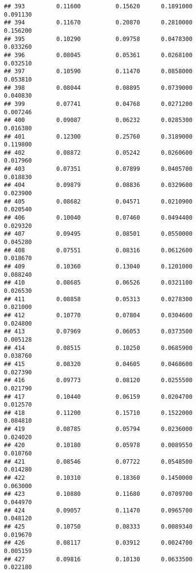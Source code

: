 \documentclass[
]{article}
\begin{document}
\begin{verbatim}
## 393         0.11600          0.15620      0.1891000            0.091130
## 394         0.11670          0.20870      0.2810000            0.156200
## 395         0.10290          0.09758      0.0478300            0.033260
## 396         0.08045          0.05361      0.0268100            0.032510
## 397         0.10590          0.11470      0.0858000            0.053810
## 398         0.08044          0.08895      0.0739000            0.040830
## 399         0.07741          0.04768      0.0271200            0.007246
## 400         0.09087          0.06232      0.0285300            0.016380
## 401         0.12300          0.25760      0.3189000            0.119800
## 402         0.08872          0.05242      0.0260600            0.017960
## 403         0.07351          0.07899      0.0405700            0.018830
## 404         0.09879          0.08836      0.0329600            0.023900
## 405         0.08682          0.04571      0.0210900            0.020540
## 406         0.10040          0.07460      0.0494400            0.029320
## 407         0.09495          0.08501      0.0550000            0.045280
## 408         0.07551          0.08316      0.0612600            0.018670
## 409         0.10360          0.13040      0.1201000            0.088240
## 410         0.08685          0.06526      0.0321100            0.026530
## 411         0.08858          0.05313      0.0278300            0.021000
## 412         0.10770          0.07804      0.0304600            0.024800
## 413         0.07969          0.06053      0.0373500            0.005128
## 414         0.08515          0.10250      0.0685900            0.038760
## 415         0.08320          0.04605      0.0468600            0.027390
## 416         0.09773          0.08120      0.0255500            0.021790
## 417         0.10440          0.06159      0.0204700            0.012570
## 418         0.11200          0.15710      0.1522000            0.084810
## 419         0.08785          0.05794      0.0236000            0.024020
## 420         0.10180          0.05978      0.0089550            0.010760
## 421         0.08546          0.07722      0.0548500            0.014280
## 422         0.10310          0.18360      0.1450000            0.063000
## 423         0.10880          0.11680      0.0709700            0.044970
## 424         0.09057          0.11470      0.0965700            0.048120
## 425         0.10750          0.08333      0.0089340            0.019670
## 426         0.08117          0.03912      0.0024700            0.005159
## 427         0.09816          0.10130      0.0633500            0.022180

\end{verbatim}
\end{document}
